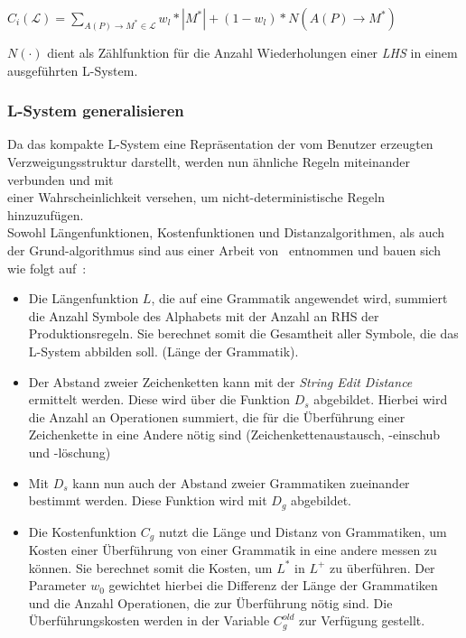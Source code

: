 \begin{algorithm}[caption={Kostenfunktion $C_i$ mit Gewichtung $w_l$}, label={alg4}]
$C_i(\mathcal{L})= \sum\limits_{A(P) \rightarrow M^* \in \mathcal{L}} w_l * |M^*| + (1 - w_l) * N(A(P)\rightarrow M^*)$
\end{algorithm}
$N(\cdot)$ dient als Zählfunktion für die Anzahl Wiederholungen einer \textit{LHS} in einem ausgeführten L-System.

\subsubsection*{L-System generalisieren}
Da das kompakte L-System eine Repräsentation der vom Benutzer erzeugten Verzweigungsstruktur darstellt, werden
nun ähnliche Regeln miteinander verbunden und mit\\einer Wahrscheinlichkeit versehen, um nicht-deterministische
Regeln hinzuzufügen.\\
Sowohl Längenfunktionen, Kostenfunktionen und Distanzalgorithmen, als auch der Grund-algorithmus sind aus einer Arbeit
von~\citeauthor{guo_2020} entnommen und bauen sich wie folgt auf~\cite{guo_2020}:

\begin{itemize}
    \item Die Längenfunktion $L$, die auf eine Grammatik angewendet wird, summiert die Anzahl Symbole des Alphabets mit
    der Anzahl an RHS der Produktionsregeln. Sie berechnet somit die Gesamtheit aller Symbole, die das L-System abbilden soll.
    (Länge der Grammatik).
    \item Der Abstand zweier Zeichenketten kann mit der \textit{String Edit Distance} ermittelt werden. Diese wird über
    die Funktion $D_s$ abgebildet. Hierbei wird die Anzahl an Operationen summiert, die für die Überführung einer Zeichenkette
    in eine Andere nötig sind (Zeichenkettenaustausch, -einschub und -löschung)
    \item Mit $D_s$ kann nun auch der Abstand zweier Grammatiken zueinander bestimmt werden. Diese Funktion wird mit
    $D_g$ abgebildet.
    \item Die Kostenfunktion $C_g$ nutzt die Länge und Distanz von Grammatiken, um Kosten einer Überführung von einer Grammatik
    in eine andere messen zu können. Sie berechnet somit die Kosten, um $L^*$ in $L^+$ zu überführen.
    Der Parameter $w_0$ gewichtet hierbei die Differenz der Länge der Grammatiken und die Anzahl Operationen, die zur
    Überführung nötig sind. Die Überführungskosten werden in der Variable $C^{old}_g$ zur Verfügung gestellt.
\end{itemize}

